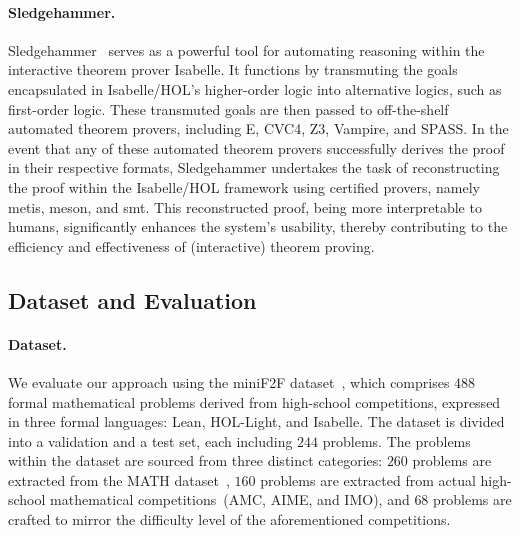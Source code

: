 \documentclass{article}
\begin{document}
\paragraph{Sledgehammer.}
Sledgehammer~\cite{paulsson2012three} serves as a powerful tool for automating reasoning within the interactive theorem prover Isabelle. It functions by transmuting the goals encapsulated in Isabelle/HOL's higher-order logic into alternative logics, such as first-order logic. These transmuted goals are then passed to off-the-shelf automated theorem provers, including E, CVC4, Z3, Vampire, and SPASS. In the event that any of these automated theorem provers successfully derives the proof in their respective formats, Sledgehammer undertakes the task of reconstructing the proof within the Isabelle/HOL framework using certified provers, namely metis, meson, and smt. This reconstructed proof, being more interpretable to humans, significantly enhances the system's usability, thereby contributing to the efficiency and effectiveness of (interactive) theorem proving.

\subsection{Dataset and Evaluation}
\label{sec:evaluation}
\paragraph{Dataset.}
We evaluate our approach using the miniF2F dataset~\cite{zheng2021minif2f}, which comprises $488$ formal mathematical problems derived from high-school competitions, expressed in three formal languages: Lean, HOL-Light, and Isabelle. The dataset is divided into a validation and a test set, each including $244$ problems. The problems within the dataset are sourced from three distinct categories: $260$ problems are extracted from the MATH dataset~\cite{hendrycks2021measuring}, $160$ problems are extracted from actual high-school mathematical competitions~(AMC, AIME, and IMO), and $68$ problems are crafted to mirror the difficulty level of the aforementioned competitions.
\end{document}
